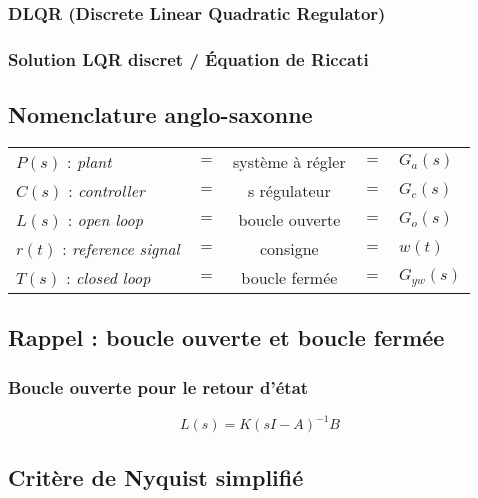 \documentclass[document.tex]{subfiles}
\begin{document}
\subsubsection{DLQR (Discrete Linear Quadratic Regulator)}


\subsubsection{Solution LQR discret / Équation de Riccati}


\subsection{Nomenclature anglo-saxonne}


\begin{tabular}{l c c c l}

$P(s)$ : \textit{plant} & $=$ & système à régler & $=$ & $G_a(s)$ \\

$C(s)$ : \textit{controller} & $=$ & s régulateur & $=$ & $G_c(s)$ \\

$L(s)$ : \textit{open loop} & $=$ & boucle ouverte & $=$ & $G_o(s)$ \\

$r(t)$ : \textit{reference signal} & $=$ & consigne & $=$ & $w(t)$ \\

$T(s)$ : \textit{closed loop} & $=$ & boucle fermée & $=$ & $G_{yw}(s)$ \\

\end{tabular}

\subsection{Rappel : boucle ouverte et boucle fermée}


\subsubsection{Boucle ouverte pour le retour d'état}


$$\boxed{L(s)=K(sI-A)^{-1}B}$$

\subsection{Critère de Nyquist simplifié}
\end{document}
